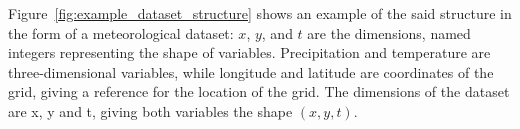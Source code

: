 Figure~\ref{fig:example_dataset_structure} shows an example of the said structure in the form of a meteorological dataset: $x$, $y$, and $t$ are the dimensions, named integers representing the shape of variables. 
Precipitation and temperature are three-dimensional variables, while longitude and latitude are coordinates of the grid, giving a reference for the location of the grid. The dimensions of the dataset are x, y and t, giving both variables the shape $(x, y, t)$. \cite{hoyer_xarray_2017}
